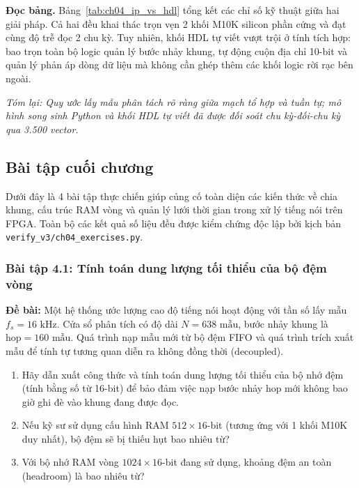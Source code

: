 \textbf{Đọc bảng.} Bảng~\ref{tab:ch04_ip_vs_hdl} tổng kết các chỉ số kỹ thuật giữa hai giải pháp. Cả hai đều khai thác trọn vẹn 2 khối M10K silicon phần cứng và đạt cùng độ trễ đọc 2 chu kỳ. Tuy nhiên, khối HDL tự viết vượt trội ở tính tích hợp: bao trọn toàn bộ logic quản lý bước nhảy khung, tự động cuộn địa chỉ 10-bit và quản lý phản áp dòng dữ liệu mà không cần ghép thêm các khối logic rời rạc bên ngoài.

\textit{Tóm lại: Quy ước lấy mẫu phân tách rõ ràng giữa mạch tổ hợp và tuần tự; mô hình song sinh Python và khối HDL tự viết đã được đối soát chu kỳ-đối-chu kỳ qua 3.500 vector.}

\subsection*{Bài tập cuối chương}

Dưới đây là 4 bài tập thực chiến giúp củng cố toàn diện các kiến thức về chia khung, cấu trúc RAM vòng và quản lý lưới thời gian trong xử lý tiếng nói trên FPGA. Toàn bộ các kết quả số liệu đều được kiểm chứng độc lập bởi kịch bản \texttt{verify\_v3/ch04\_exercises.py}.

\subsubsection*{Bài tập 4.1: Tính toán dung lượng tối thiểu của bộ đệm vòng}
\textbf{Đề bài:} Một hệ thống ước lượng cao độ tiếng nói hoạt động với tần số lấy mẫu $f_s = 16\text{ kHz}$. Cửa sổ phân tích có độ dài $N = 638\text{ mẫu}$, bước nhảy khung là $\text{hop} = 160\text{ mẫu}$. Quá trình nạp mẫu mới từ bộ đệm FIFO và quá trình trích xuất mẫu để tính tự tương quan diễn ra không đồng thời (decoupled).
\begin{enumerate}[label=(\alph*)]
    \item Hãy dẫn xuất công thức và tính toán dung lượng tối thiểu của bộ nhớ đệm (tính bằng số từ 16-bit) để bảo đảm việc nạp bước nhảy hop mới không bao giờ ghi đè vào khung đang được đọc.
    \item Nếu kỹ sư sử dụng cấu hình RAM $512 \times 16$-bit (tương ứng với 1 khối M10K duy nhất), bộ đệm sẽ bị thiếu hụt bao nhiêu từ?
    \item Với bộ nhớ RAM vòng $1024 \times 16$-bit đang sử dụng, khoảng đệm an toàn (headroom) là bao nhiêu từ?
\end{enumerate}

